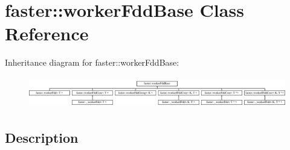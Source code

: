 \hypertarget{classfaster_1_1workerFddBase}{}\section{faster\+:\+:worker\+Fdd\+Base Class Reference}
\label{classfaster_1_1workerFddBase}
Inheritance diagram for faster\+:\+:worker\+Fdd\+Base\+:\begin{figure}[H]
\begin{center}
\leavevmode
\includegraphics[height=1.365854cm]{classfaster_1_1workerFddBase}
\end{center}
\end{figure}


\subsection{Description}
